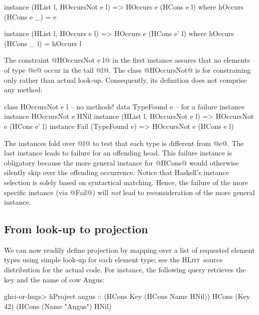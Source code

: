\documentclass[nocopyrightspace,preprint]{sigplan-proc}
\newcommand{\hwVsTr}[2]{#2}
\newcommand{\HList}{\textsc{HList}}
\begin{document}
\begin{code}
 instance (HList l, HOccursNot e l)
       => HOccurs e (HCons e l)
   where  hOccurs (HCons e _) = e
\end{code}

\begin{code}
 instance (HList l, HOccurs e l)
       => HOccurs e (HCons e' l)
   where  hOccurs (HCons _ l) = hOccurs l
\end{code}

The constraint @HOccursNot e l@ in the first instance assures that no
elements of type @e@ occur in the tail @l@. The class @HOccursNot@ is
for constraining only rather than actual look-up. Consequently, its
definition does not comprise any method:

\begin{code}
 class HOccursNot e l    -- no methods!
 data TypeFound e        -- for a failure instance
 instance HOccursNot e HNil
 instance (HList l, HOccursNot e l)
       => HOccursNot e (HCons e' l)
 instance Fail (TypeFound e)
       => HOccursNot e (HCons e l)
\end{code}

The instances fold over @l@ to test that each type is different from
@e@. The last instance leads to failure for an offending head. This
failure instance is obligatory because the more general instance for
@HCons@ would otherwise silently skip over the offending
occurrence. Notice that Haskell's instance selection is solely based
on syntactical matching. Hence, the failure of the more specific
instance (via @Fail@) will \emph{not} lead to reconsideration of the
more general instance.


\medskip

\subsection*{From look-up to projection}

We can now readily define projection by mapping over a list of
requested element types using simple look-up for each element type;
\hwVsTr{see~\cite{HList}}{see the \HList\ source distribution} for the
actual code. For instance, the following query retrieves the key and
the name of cow Angus:

\begin{code}
 ghci-or-hugs> hProject angus 
               :: (HCons Key (HCons Name HNil))
 HCons (Key 42) (HCons (Name "Angus") HNil)
\end{code}
\end{document}
